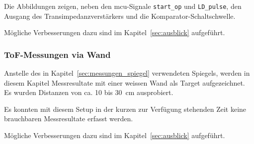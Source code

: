Die Abbildungen zeigen, neben den \acrshort{mcu}-Signale \lstinline|start_op| und \lstinline|LD_pulse|, den Ausgang
des Transimpedanzverstärkers und die Komparator-Schaltschwelle.

Mögliche Verbesserungen dazu sind im Kapitel~\ref{sec:ausblick} aufgeführt.

\subsubsection{ToF-Messungen via Wand}\label{sec:messungen_wand}

Anstelle des in Kapitel~\ref{sec:messungen_spiegel} verwendeten Spiegels, werden in diesem Kapitel Messresultate mit
einer weissen Wand als Target aufgezeichnet. Es wurden Distanzen von ca. 10 bis 30~cm ausprobiert.

Es konnten mit diesem Setup in der kurzen zur Verfügung stehenden Zeit keine brauchbaren Messresultate erfasst werden.

Mögliche Verbesserungen dazu sind im Kapitel~\ref{sec:ausblick} aufgeführt.
